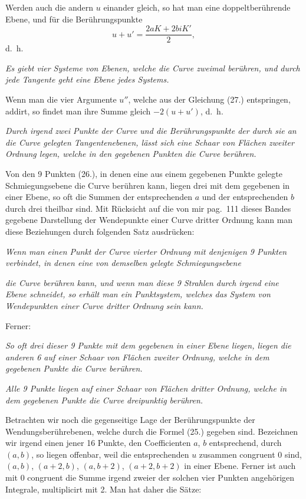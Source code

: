 \documentclass{article}
\begin{document}
Werden auch die andern $u$ einander gleich, so hat man eine doppeltberührende Ebene, und für die Berührungspunkte
\[
u+u' = \frac{2aK+2biK'}{2}, \tag{28.}
\]
d.\ h.

\emph{Es giebt vier Systeme von Ebenen, welche die Curve zweimal berühren, und durch jede Tangente geht eine Ebene jedes Systems.}

Wenn man die vier Argumente $u''$, welche aus der Gleichung (27.) entspringen, addirt, so findet man ihre Summe gleich $-2(u+u')$, d.\ h.

\emph{Durch irgend zwei Punkte der Curve und die Berührungspunkte der durch sie an die Curve gelegten Tangentenebenen, lässt sich eine Schaar von Flächen zweiter Ordnung legen, welche in den gegebenen Punkten die Curve berühren.}

Von den 9 Punkten (26.), in denen eine aus einem gegebenen Punkte gelegte Schmiegungsebene die Curve berühren kann, liegen drei mit dem gegebenen in einer Ebene, so oft die Summen der entsprechenden $a$ und der entsprechenden $b$ durch drei theilbar sind. Mit Rücksicht auf die von mir pag.\ 111 dieses Bandes gegebene Darstellung der Wendepunkte einer Curve dritter Ordnung kann man diese Beziehungen durch folgenden Satz ausdrücken:

\emph{Wenn man einen Punkt der Curve vierter Ordnung mit denjenigen 9 Punkten verbindet, in denen eine von demselben gelegte Schmiegungsebene}

\emph{die Curve berühren kann, und wenn man diese 9 Strahlen durch irgend eine Ebene schneidet, so erhält man ein Punktsystem, welches das System von Wendepunkten einer Curve dritter Ordnung sein kann.}

Ferner:

\emph{So oft drei dieser 9 Punkte mit dem gegebenen in einer Ebene liegen, liegen die anderen 6 auf einer Schaar von Flächen zweiter Ordnung, welche in dem gegebenen Punkte die Curve berühren.}

\emph{Alle 9 Punkte liegen auf einer Schaar von Flächen dritter Ordnung, welche in dem gegebenen Punkte die Curve dreipunktig berühren.}

Betrachten wir noch die gegenseitige Lage der Berührungspunkte der Wendungsberührebenen, welche durch die Formel (25.) gegeben sind. Bezeichnen wir irgend einen jener 16 Punkte, den Coefficienten $a$, $b$ entsprechend, durch $(a,b)$, so liegen offenbar, weil die entsprechenden $u$ zusammen congruent 0 sind, $(a,b)$, $(a+2,b)$, $(a,b+2)$, $(a+2,b+2)$ in einer Ebene. Ferner ist auch mit 0 congruent die Summe irgend zweier der solchen vier Punkten angehörigen Integrale, multiplicirt mit 2. Man hat daher die Sätze:
\end{document}

